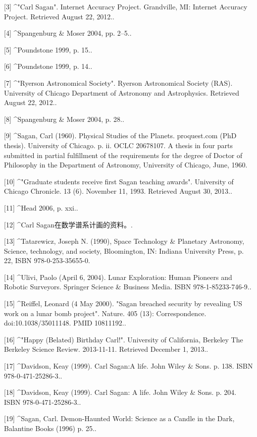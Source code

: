 [3]
^"Carl Sagan". Internet Accuracy Project. Grandville, MI: Internet Accuracy Project. Retrieved August 22, 2012..

[4]
^Spangenburg & Moser 2004, pp. 2–5..

[5]
^Poundstone 1999, p. 15..

[6]
^Poundstone 1999, p. 14..

[7]
^"Ryerson Astronomical Society". Ryerson Astronomical Society (RAS). University of Chicago Department of Astronomy and Astrophysics. Retrieved August 22, 2012..

[8]
^Spangenburg & Moser 2004, p. 28..

[9]
^Sagan, Carl (1960). Physical Studies of the Planets. proquest.com (PhD thesis). University of Chicago. p. ii. OCLC 20678107. A thesis in four parts submitted in partial fulfillment of the requirements for the degree of Doctor of Philosophy in the Department of Astronomy, University of Chicago, June, 1960.

[10]
^"Graduate students receive first Sagan teaching awards". University of Chicago Chronicle. 13 (6). November 11, 1993. Retrieved August 30, 2013..

[11]
^Head 2006, p. xxi..

[12]
^Carl Sagan在数学谱系计画的资料。.

[13]
^Tatarewicz, Joseph N. (1990), Space Technology & Planetary Astronomy, Science, technology, and society, Bloomington, IN: Indiana University Press, p. 22, ISBN 978-0-253-35655-0.

[14]
^Ulivi, Paolo (April 6, 2004). Lunar Exploration: Human Pioneers and Robotic Surveyors. Springer Science & Business Media. ISBN 978-1-85233-746-9..

[15]
^Reiffel, Leonard (4 May 2000). "Sagan breached security by revealing US work on a lunar bomb project". Nature. 405 (13): Correspondence. doi:10.1038/35011148. PMID 10811192..

[16]
^"Happy (Belated) Birthday Carl!". University of California, Berkeley The Berkeley Science Review. 2013-11-11. Retrieved December 1, 2013..

[17]
^Davidson, Keay (1999). Carl Sagan:A life. John Wiley & Sons. p. 138. ISBN 978-0-471-25286-3..

[18]
^Davidson, Keay (1999). Carl Sagan: A life. John Wiley & Sons. p. 204. ISBN 978-0-471-25286-3..

[19]
^Sagan, Carl. Demon-Haunted World: Science as a Candle in the Dark, Balantine Books (1996) p. 25..

